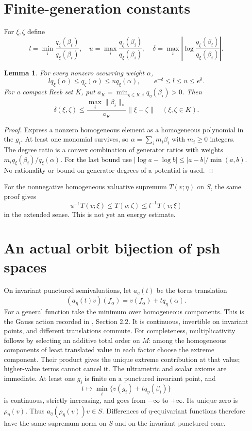 \documentclass[11pt]{article}
\newtheorem{lemma}[theorem]{Lemma}
\begin{document}
\section{Finite-generation constants}
For $\xi,\zeta$ define
\[
 l=\min_i\frac{q_\zeta(\beta_i)}{q_\xi(\beta_i)},\quad
 u=\max_i\frac{q_\zeta(\beta_i)}{q_\xi(\beta_i)},\quad
 \delta=\max_i\left|\log\frac{q_\zeta(\beta_i)}{q_\xi(\beta_i)}\right|.
\]
\begin{lemma}\label{degrees}
For every nonzero occurring weight $\alpha$,
\[
 lq_\xi(\alpha)\leq q_\zeta(\alpha)\leq uq_\xi(\alpha),
 \qquad e^{-\delta}\leq l\leq u\leq e^\delta.
\]
For a compact Reeb set $K$, put $a_K=\min_{\eta\in K,i}q_\eta(\beta_i)>0$.
Then
\[
 \delta(\xi,\zeta)\leq
 \frac{\max_i\|\beta_i\|_*}{a_K}\|\xi-\zeta\|\quad(\xi,\zeta\in K).
\]
\end{lemma}
\begin{proof}
Express a nonzero homogeneous element as a homogeneous polynomial in the $g_i$.
At least one monomial survives, so $\alpha=\sum_i m_i\beta_i$ with $m_i\geq0$ integers.
The degree ratio is a convex combination of generator ratios with weights $m_iq_\xi(\beta_i)/q_\xi(\alpha)$.
For the last bound use $|\log a-\log b|\leq|a-b|/\min(a,b)$.
No rationality or bound on generator degrees of a potential is used.
\end{proof}
For the nonnegative homogeneous valuative supremum $T(v;\eta)$ on $S$, the same proof gives
\[
 u^{-1}T(v;\xi)\leq T(v;\zeta)\leq l^{-1}T(v;\xi)
\]
in the extended sense. This is not yet an energy estimate.

\section{An actual orbit bijection of psh spaces}
On invariant punctured semivaluations, let $a_\eta(t)$ be the torus translation
\[
 (a_\eta(t)v)(f_\alpha)=v(f_\alpha)+tq_\eta(\alpha).
\]
For a general function take the minimum over homogeneous components.
This is the Gauss action recorded in \cite{YW24}, Section 2.2.
It is continuous, invertible on invariant points, and different translations commute.
For completeness, multiplicativity follows by selecting an additive total order on $M$:
among the homogeneous components of least translated value in each factor choose the extreme component.
Their product gives the unique extreme contribution at that value; higher-value terms cannot cancel it.
The ultrametric and scalar axioms are immediate.
At least one $g_i$ is finite on a punctured invariant point, and
\[
 t\longmapsto\min_i\{v(g_i)+tq_\eta(\beta_i)\}
\]
is continuous, strictly increasing, and goes from $-\infty$ to $+\infty$.
Its unique zero is $\rho_\eta(v)$.
Thus $a_\eta(\rho_\eta(v))v\in S$.
Differences of $\eta$-equivariant functions therefore have the same supremum norm on $S$ and on the invariant punctured cone.
\end{document}
